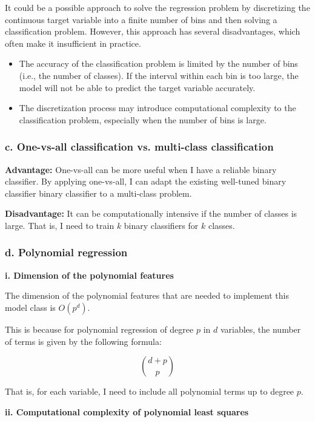 \documentclass[10pt]{article}
\begin{document}
It could be a possible approach to solve the regression problem by discretizing the continuous target variable into a finite number of bins and then solving a classification problem. However, this approach has several disadvantages, which often make it insufficient in practice. 

\begin{itemize}
    \item The accuracy of the classification problem is limited by the number of bins (i.e., the number of classes). If the interval within each bin is too large, the model will not be able to predict the target variable accurately.
    \item The discretization process may introduce computational complexity to the classification problem, especially when the number of bins is large.
\end{itemize}


\subsubsection*{c. One-vs-all classification vs. multi-class classification}

\textbf{Advantage:} One-vs-all can be more useful when I have a reliable binary classifier. By applying one-vs-all, I can adapt the existing well-tuned binary classifier binary classifier to a multi-class problem.

\textbf{Disadvantage:} It can be computationally intensive if the number of classes is large. That is, I need to train $k$ binary classifiers for $k$ classes.


\subsubsection*{d. Polynomial regression}

\textbf{i. Dimension of the polynomial features}

The dimension of the polynomial features that are needed to implement this model class is \( O(p^d) \).

This is because for polynomial regression of degree \( p \) in \( d \) variables, the number of terms is given by the following formula:

\[
\binom{d+p}{p}
\]

That is, for each variable, I need to include all polynomial terms up to degree \( p \).

\textbf{ii. Computational complexity of polynomial least squares}
\end{document}
